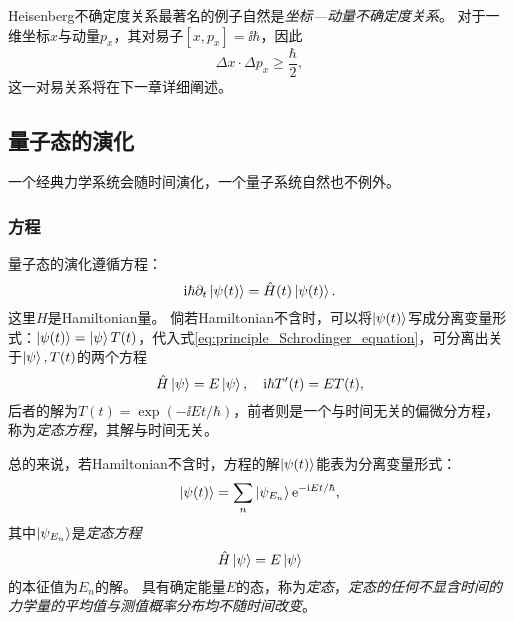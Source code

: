 Heisenberg不确定度关系最著名的例子自然是\emph{坐标—动量不确定度关系}。
对于一维坐标$x$与动量$p_x$，其对易子$[x,p_x]=\ii\hbar$，因此
\begin{equation}
    \label{eq:principle_uncertainty_relation_x_px}
    \Delta x \cdot \Delta p_x \geq \frac{\hbar}{2},
\end{equation}
这一对易关系将在下一章详细阐述。


\subsection{量子态的演化}
\label{subsec:principles_time_evolution}

一个经典力学系统会随时间演化，一个量子系统自然也不例外。

\subsubsection{\schrodinger 方程}

量子态的演化遵循\schrodinger 方程：
\begin{equation}
    \label{eq:principle_Schrodinger_equation}
    \mathrm{i} \hbar \partial_t \ket{\psi(t)} = \hat{H}(t) \ket{\psi(t)}.
\end{equation}
这里$H$是Hamiltonian量。
倘若Hamiltonian不含时，可以将$\ket{\psi(t)}$写成分离变量形式：$\ket{\psi(t)}=\ket{\psi}T(t)$，代入式\eqref{eq:principle_Schrodinger_equation}，可分离出关于$\ket{\psi}, T(t)$的两个方程
\begin{equation}
    \hat{H} \ket{\psi} = E \ket{\psi},\quad \mathrm{i}\hbar T'(t) = E T(t),
\end{equation}
后者的解为$T(t) = \exp (-\ii E t/\hbar)$，前者则是一个与时间无关的偏微分方程，称为\emph{定态\schrodinger 方程}，其解与时间无关。

总的来说，若Hamiltonian不含时，\schrodinger 方程的解$\ket{\psi(t)}$能表为分离变量形式：
\begin{equation}
    \ket{\psi(t)} = \sum_n \ket{\psi_{E_n}} \mathrm{e}^{-\mathrm{i} E t/\hbar},
\end{equation}
其中$\ket{\psi_{E_n}}$是\emph{定态\schrodinger 方程}
\begin{equation}
    \hat{H} \ket{\psi} = E \ket{\psi}
\end{equation}
的本征值为$E_n$的解。
具有确定能量$E$的态，称为\emph{定态}，\emph{定态的任何不显含时间的力学量的平均值与测值概率分布均不随时间改变}。


